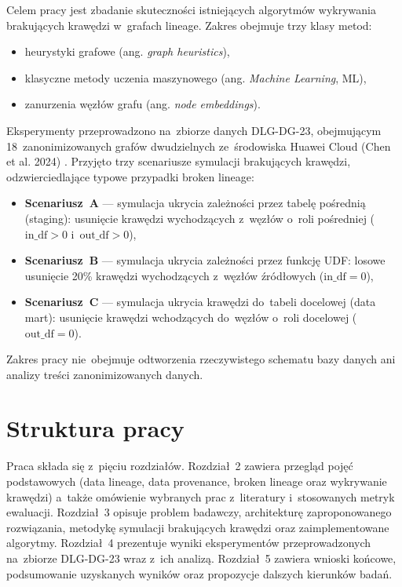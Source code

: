 \documentclass[polish,master,a4paper,oneside]{ppfcmthesis}
\begin{document}
Celem pracy jest zbadanie skuteczności istniejących algorytmów wykrywania
brakujących krawędzi w~grafach lineage. Zakres obejmuje trzy klasy metod:

\begin{itemize}
  \item heurystyki grafowe (ang. \emph{graph heuristics}),
  \item klasyczne metody uczenia maszynowego (ang. \emph{Machine Learning}, ML),
  \item zanurzenia węzłów grafu (ang. \emph{node embeddings}).
\end{itemize}

Eksperymenty przeprowadzono na~zbiorze danych DLG-DG-23, obejmującym
18~zanonimizowanych grafów dwudzielnych ze~środowiska Huawei Cloud (Chen et al. 2024) 
\cite{Chen2024}. Przyjęto trzy scenariusze symulacji brakujących krawędzi,
odzwierciedlające typowe przypadki broken lineage:

\begin{itemize}
  \item \textbf{Scenariusz~A} — symulacja ukrycia zależności przez tabelę pośrednią (staging):
        usunięcie krawędzi wychodzących z~węzłów o~roli pośredniej
        ($\mathrm{in\_df}>0$ i~$\mathrm{out\_df}>0$),
  \item \textbf{Scenariusz~B} — symulacja ukrycia zależności przez funkcję UDF:
        losowe usunięcie 20\% krawędzi wychodzących z~węzłów źródłowych
        ($\mathrm{in\_df}=0$),
  \item \textbf{Scenariusz~C} — symulacja ukrycia krawędzi do~tabeli docelowej (data mart):
        usunięcie krawędzi wchodzących do~węzłów o~roli docelowej
        ($\mathrm{out\_df}=0$).
\end{itemize}

Zakres pracy nie~obejmuje %
odtworzenia rzeczywistego schematu bazy danych ani analizy treści
zanonimizowanych danych.


\section{Struktura pracy}

Praca składa się z~pięciu rozdziałów. Rozdział~2 zawiera przegląd pojęć
podstawowych (data lineage, data provenance, broken lineage oraz wykrywanie
krawędzi) a~także omówienie wybranych prac z~literatury i~stosowanych
metryk ewaluacji. Rozdział~3 opisuje problem badawczy, architekturę
zaproponowanego rozwiązania, metodykę symulacji brakujących krawędzi oraz
zaimplementowane algorytmy. Rozdział~4 prezentuje wyniki eksperymentów
przeprowadzonych na~zbiorze DLG-DG-23 wraz z~ich analizą. Rozdział~5
zawiera wnioski końcowe, podsumowanie uzyskanych wyników oraz propozycje
dalszych kierunków badań.
\end{document}
